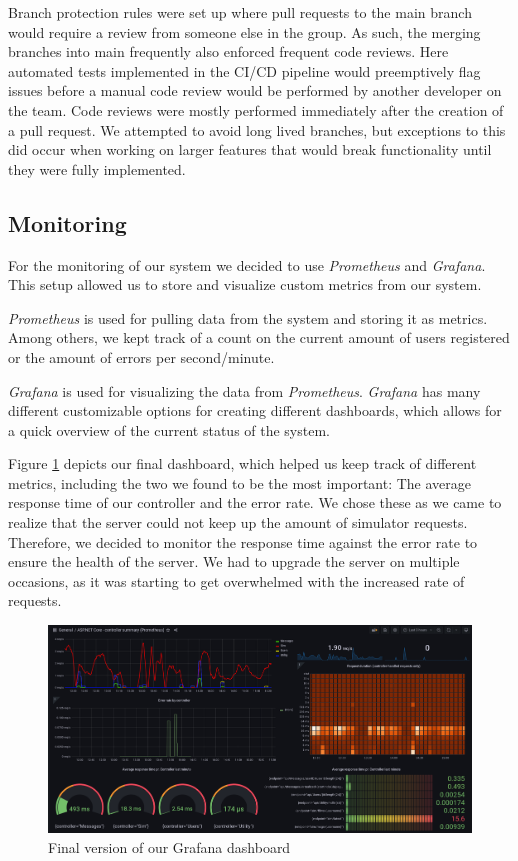 Branch protection rules were set up where pull requests to the main branch would require a review from someone else in the group. As such, the merging branches into main frequently also enforced frequent code reviews. Here automated tests implemented in the CI/CD pipeline would preemptively flag issues before a manual code review would be performed by another developer on the team. Code reviews were mostly performed immediately after the creation of a pull request. We attempted to avoid long lived branches, but exceptions to this did occur when working on larger features that would break functionality until they were fully implemented.

\subsection{Monitoring}


For the monitoring of our system we decided to use \textit{Prometheus} and \textit{Grafana}. This setup allowed us to store and visualize custom metrics from our system.

\textit{Prometheus} is used for pulling data from the system and storing it as metrics. Among others, we kept track of a count on the current amount of users registered or the amount of errors per second/minute.

\textit{Grafana} is used for visualizing the data from \textit{Prometheus}. \textit{Grafana} has many different customizable options for creating different dashboards, which allows for a quick overview of the current status of the system.

Figure \ref{GrafanaDashboard} depicts our final dashboard, which helped us keep track of different metrics, including the two we found to be the most important: The average response time of our controller and the error rate. We chose these as we came to realize that the server could not keep up the amount of simulator requests. Therefore, we decided to monitor the response time against the error rate to ensure the health of the server. We had to upgrade the server on multiple occasions, as it was starting to get overwhelmed with the increased rate of requests. 

\begin{figure}[H]
    \centering
    \includegraphics[width=16cm]{images/dashboard.png}
    \caption{Final version of our Grafana dashboard}
    \label{GrafanaDashboard}
\end{figure}

